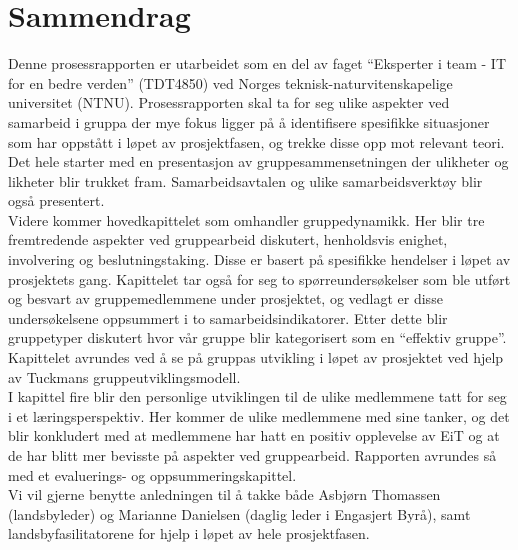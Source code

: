 \section*{Sammendrag}

Denne prosessrapporten er utarbeidet som en del av faget ``Eksperter i team - IT for en bedre verden'' (TDT4850) ved Norges teknisk-naturvitenskapelige universitet (NTNU). Prosessrapporten skal ta for seg ulike aspekter ved samarbeid i gruppa der mye fokus ligger på å identifisere spesifikke situasjoner som har oppstått i løpet av prosjektfasen, og trekke disse opp mot relevant teori. Det hele starter med en presentasjon av gruppesammensetningen der ulikheter og likheter blir trukket fram. Samarbeidsavtalen og ulike samarbeidsverktøy blir også presentert.\\

Videre kommer hovedkapittelet som omhandler gruppedynamikk. Her blir tre fremtredende aspekter ved gruppearbeid diskutert, henholdsvis enighet, involvering og beslutningstaking. Disse er basert på spesifikke hendelser i løpet av prosjektets gang. Kapittelet tar også for seg to spørreundersøkelser som ble utført og besvart av gruppemedlemmene under prosjektet, og vedlagt er disse undersøkelsene oppsummert i to samarbeidsindikatorer. Etter dette blir gruppetyper diskutert hvor vår gruppe blir kategorisert som en “effektiv gruppe”. Kapittelet avrundes ved å se på gruppas utvikling i løpet av prosjektet ved hjelp av Tuckmans gruppeutviklingsmodell.\\

I kapittel fire blir den personlige utviklingen til de ulike medlemmene tatt for seg i et læringsperspektiv. Her kommer de ulike medlemmene med sine tanker, og det blir konkludert med at medlemmene har hatt en positiv opplevelse av EiT og at de har blitt mer bevisste på aspekter ved gruppearbeid. Rapporten avrundes så med et evaluerings- og oppsummeringskapittel.\\

Vi vil gjerne benytte anledningen til å takke både Asbjørn Thomassen (landsbyleder) og Marianne Danielsen (daglig leder i Engasjert Byrå), samt landsbyfasilitatorene for hjelp i løpet av hele prosjektfasen.
